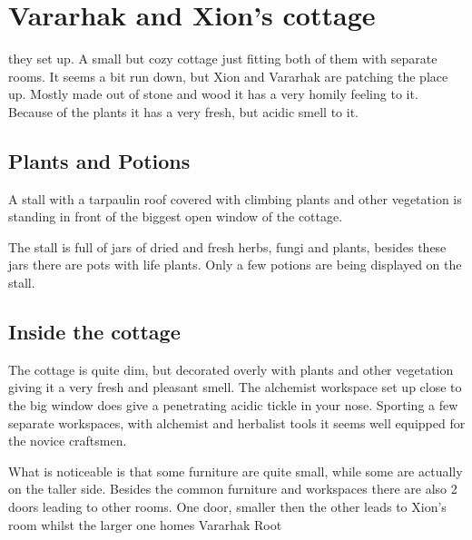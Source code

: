 \chapter{Vararhak and Xion's cottage}
\label{shop}

 they set up. 
A small but cozy cottage just fitting both of them with separate rooms. It seems a bit run down, but Xion and Vararhak are patching the place up. Mostly made out of stone and wood it has a very homily feeling to it. Because of the plants it has a very fresh, but acidic smell to it.

\section{Plants and Potions}
A stall with a tarpaulin roof covered with climbing plants and other vegetation is standing in front of the biggest open window of the cottage. 

The stall is full of jars of dried and fresh herbs, fungi and plants, besides these jars there are pots with life plants. Only a few potions are being displayed on the stall. 

\section{Inside the cottage}
The cottage is quite dim, but decorated overly with plants and other vegetation giving it a very fresh and pleasant smell. The alchemist workspace set up close to the big window does give a penetrating acidic tickle in your nose. Sporting a few separate workspaces, with alchemist and herbalist tools it seems well equipped for the novice craftsmen.

What is noticeable is that some furniture are quite small, while some are actually on the taller side. Besides the common furniture and workspaces there are also 2 doors leading to other rooms. One door, smaller then the other leads to Xion's room whilst the larger one homes Vararhak Root